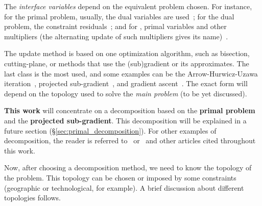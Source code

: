 \documentclass[../main.tex]{subfiles}
\begin{document}
The \emph{interface variables} depend on the equivalent problem chosen. For instance, for the primal problem, usually, the dual variables are used~\cite{Cohen1978}; for the dual problem, the constraint residuals~\cite{BoydEtAl2015}; and for \ADMM, primal variables and other multipliers (the alternating update of such multipliers gives its name)~\cite{BoydEtAl2011}.

The update method is based on one optimization algorithm, such as bisection, cutting-plane, or methods that use the (sub)gradient or its approximates. The last class is the most used, and some examples can be the Arrow-Hurwicz-Uzawa iteration~\cite{BourdaisEtAl2012}, projected sub-gradient~\cite{BiegelEtAl2012}, and gradient ascent~\cite{BoydEtAl2011}.
The exact form will depend on the topology used to solve the \emph{main problem} (to be yet discussed).

\textbf{This work} will concentrate on a decomposition based on the \textbf{primal problem} and the \textbf{projected sub-gradient}.
This decomposition will be explained in a future section (\S\ref{sec:primal_decomposition}).
For other examples of decomposition, the reader is referred to~\cite{MaestreEtAl2014} or~\cite{ConejoEtAl2006} and other articles cited throughout this work.

Now, after choosing a decomposition method, we need to know the topology of the problem.
This topology can be chosen or imposed by some constraints (geographic or technological, for example). A brief discussion about different topologies follows.

\end{document}
